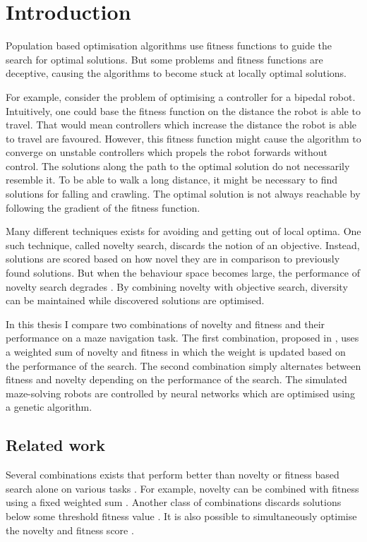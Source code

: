 \section{Introduction}

\label{sec:intro}

Population based optimisation algorithms use fitness functions to guide the search for optimal solutions.
But some problems and fitness functions are deceptive, causing the algorithms to become stuck at
locally optimal solutions.

For example, consider the problem of optimising a controller for a bipedal
robot. Intuitively, one could base the fitness function on the distance the robot is able to travel.
That would mean controllers which increase the distance the robot is able to travel are favoured.
However, this fitness function might cause the algorithm to converge on unstable controllers which
propels the robot forwards without control. The solutions along the path to the optimal solution
do not necessarily resemble it. To be able to walk a long distance, it might be necessary to find
solutions for falling and crawling. The optimal solution is not always reachable by following
the gradient of the fitness function.

Many different techniques exists for avoiding and getting out of local optima. One such technique, called
novelty search, discards the notion of an objective. Instead, solutions are scored based on how novel
they are in comparison to previously found solutions. But when the behaviour space becomes large, the performance
of novelty search degrades \cite{novelty_not_enough}. By combining novelty with objective search, diversity
can be maintained while discovered solutions are optimised.

In this thesis I compare two combinations of novelty and fitness and their performance
on a maze navigation task. The first combination, proposed in \cite{novelty_not_enough}, uses a weighted
sum of novelty and fitness in which the weight is updated based on the performance of the search.
The second combination simply alternates between fitness and novelty depending on the performance
of the search. The simulated maze-solving robots are controlled by neural networks which are
optimised using a genetic algorithm.

\subsection{Related work}
Several combinations exists that perform better than novelty or fitness based search alone
on various tasks \cite{ns_study}. For example, novelty can be combined with fitness using a
fixed weighted sum \cite{novelty_not_enough}. Another class of combinations discards solutions below
some threshold fitness value \cite{minimal_ns}. It is also possible to simultaneously optimise
the novelty and fitness score \cite{multi_ns}.
